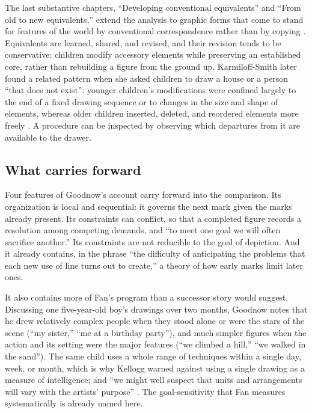 \documentclass[11pt]{article}
\theoremstyle{remark}
\begin{document}
The last substantive chapters, ``Developing conventional equivalents'' and ``From old to new equivalents,'' extend the analysis to graphic forms that come to stand for features of the world by conventional correspondence rather than by copying \cite[chs.~5--6, pp.~112--149]{goodnow1977}. Equivalents are learned, shared, and revised, and their revision tends to be conservative: children modify accessory elements while preserving an established core, rather than rebuilding a figure from the ground up. Karmiloff-Smith later found a related pattern when she asked children to draw a house or a person ``that does not exist'': younger children's modifications were confined largely to the end of a fixed drawing sequence or to changes in the size and shape of elements, whereas older children inserted, deleted, and reordered elements more freely \cite{karmiloff1990}. A procedure can be inspected by observing which departures from it are available to the drawer.

\subsection{What carries forward}

Four features of Goodnow's account carry forward into the comparison. Its organization is local and sequential: it governs the next mark given the marks already present. Its constraints can conflict, so that a completed figure records a resolution among competing demands, and ``to meet one goal we will often sacrifice another.'' Its constraints are not reducible to the goal of depiction. And it already contains, in the phrase ``the difficulty of anticipating the problems that each new use of line turns out to create,'' a theory of how early marks limit later ones.

It also contains more of Fan's program than a successor story would suggest. Discussing one five-year-old boy's drawings over two months, Goodnow notes that he drew relatively complex people when they stood alone or were the stars of the scene (``my sister,'' ``me at a birthday party''), and much simpler figures when the action and its setting were the major features (``we climbed a hill,'' ``we walked in the sand''). The same child uses a whole range of techniques within a single day, week, or month, which is why Kellogg warned against using a single drawing as a measure of intelligence; and ``we might well suspect that units and arrangements will vary with the artists' purpose'' \cite[pp.~46--47]{goodnow1977}. The goal-sensitivity that Fan measures systematically is already named here.
\end{document}
